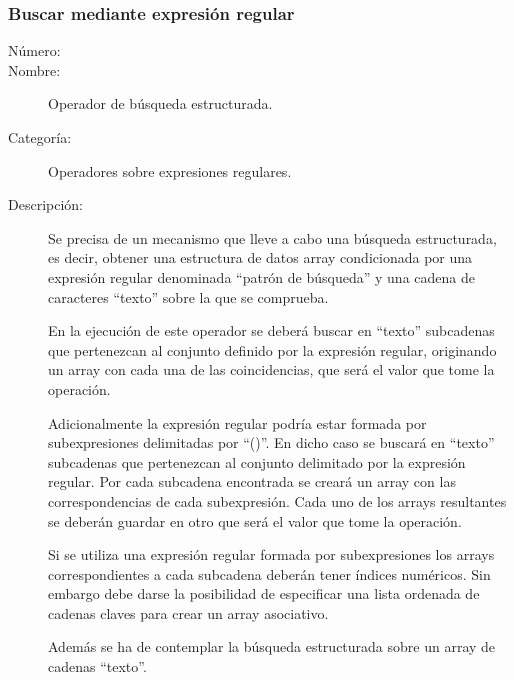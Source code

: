 \subsubsection{Buscar mediante expresión regular}
\begin{framed}
	\begin{description}
		\item [Número:] \cn
		\item [Nombre:] Operador de búsqueda estructurada.
		\item [Categoría:] Operadores sobre expresiones regulares.
		\item [Descripción:] Se precisa de un mecanismo que lleve a cabo una búsqueda estructurada, es decir,
		obtener una estructura de datos array condicionada por una expresión regular denominada
		``patrón de búsqueda'' y una cadena de caracteres ``texto'' sobre la que se comprueba.

		En la ejecución de este operador se deberá
		buscar en ``texto'' subcadenas que pertenezcan al conjunto definido por la expresión regular, originando
		un array con cada una de las coincidencias, que será el valor que tome la operación.
		
		Adicionalmente la expresión regular podría estar formada por subexpresiones delimitadas
		por ``()''. En dicho caso se buscará en ``texto'' subcadenas que pertenezcan al
		conjunto delimitado por la expresión regular. Por cada subcadena encontrada se creará un array
		con las correspondencias de cada subexpresión. Cada uno de los arrays resultantes se
		deberán guardar en otro que será el valor que tome la operación.
		
		Si se utiliza una expresión regular formada por subexpresiones los arrays correspondientes
		a cada subcadena deberán tener índices numéricos. Sin embargo debe darse la posibilidad de
		especificar una lista ordenada de cadenas claves para crear un array asociativo.
 
		Además se ha de contemplar la búsqueda estructurada sobre un array de cadenas ``texto''.
	\end {description}
\end{framed}
